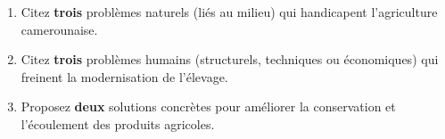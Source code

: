\documentclass[11pt]{article}
\begin{document}
\begin{exercice}
\begin{enumerate}
    \item Citez \textbf{trois} problèmes naturels (liés au milieu) qui handicapent l'agriculture camerounaise.
    \item Citez \textbf{trois} problèmes humains (structurels, techniques ou économiques) qui freinent la modernisation de l'élevage.
    \item Proposez \textbf{deux} solutions concrètes pour améliorer la conservation et l'écoulement des produits agricoles.
\end{enumerate}
\end{exercice}
\end{document}
